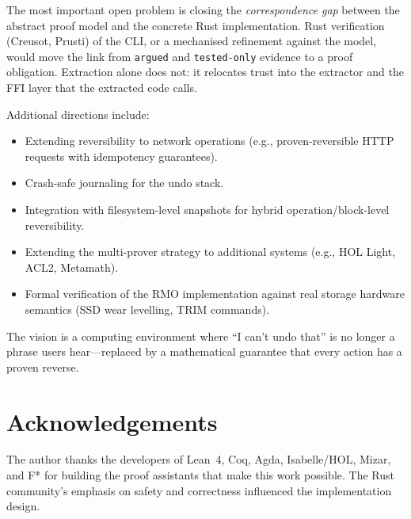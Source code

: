 \documentclass[11pt,a4paper]{article}
\begin{document}
The most important open problem is closing the \emph{correspondence gap}
between the abstract proof model and the concrete Rust implementation.
Rust verification (Creusot, Prusti) of the CLI, or a mechanised refinement
against the model, would move the link from \texttt{argued} and \texttt{tested-only}
evidence to a proof obligation. Extraction alone does not: it relocates trust
into the extractor and the FFI layer that the extracted code calls.

Additional directions include:
\begin{itemize}
  \item Extending reversibility to network operations (e.g., proven-reversible
        HTTP requests with idempotency guarantees).
  \item Crash-safe journaling for the undo stack.
  \item Integration with filesystem-level snapshots for hybrid
        operation/block-level reversibility.
  \item Extending the multi-prover strategy to additional systems (e.g.,
        HOL Light, ACL2, Metamath).
  \item Formal verification of the RMO implementation against real storage
        hardware semantics (SSD wear levelling, TRIM commands).
\end{itemize}

The vision is a computing environment where ``I can't undo that'' is no
longer a phrase users hear---replaced by a mathematical guarantee that every
action has a proven reverse.

\section*{Acknowledgements}

The author thanks the developers of Lean~4, Coq, Agda, Isabelle/HOL, Mizar,
and F* for building the proof assistants that make this work possible. The
Rust community's emphasis on safety and correctness influenced the
implementation design.


\end{document}
